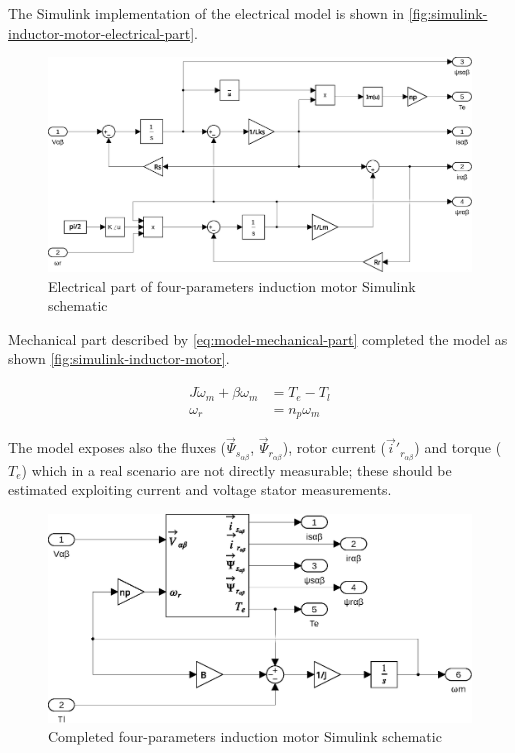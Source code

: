 The Simulink implementation of the electrical model is shown in \autoref{fig:simulink-inductor-motor-electrical-part}.

\begin{figure}[htb]
	\centering
	\includegraphics[width=\textwidth]{schematics/inductor_motor_electrical_part}
	\caption{Electrical part of four-parameters induction motor Simulink schematic}
	\label{fig:simulink-inductor-motor-electrical-part}
\end{figure}

Mechanical part described by \autoref{eq:model-mechanical-part} completed the model as shown \autoref{fig:simulink-inductor-motor}.

\begin{align}
	\label{eq:model-mechanical-part}
	J \dot\omega_m + \beta\omega_m &= T_e - T_l \nonumber \\
	\omega_r &= n_p \omega_m
\end{align}

The model exposes also the fluxes ($\vec{\Psi}_{s_{\alpha\beta}}$, $\vec{\Psi}_{r_{\alpha\beta}}$), rotor current ($\vec{i}'_{r_{\alpha\beta}}$) and torque ($T_e$) which in a real scenario are not directly measurable; these should be estimated exploiting current and voltage stator measurements.

\begin{figure}[htb]
	\centering
	\includegraphics[width=\textwidth]{schematics/inductor_motor}
	\caption{Completed four-parameters induction motor Simulink schematic}
	\label{fig:simulink-inductor-motor}
\end{figure}

